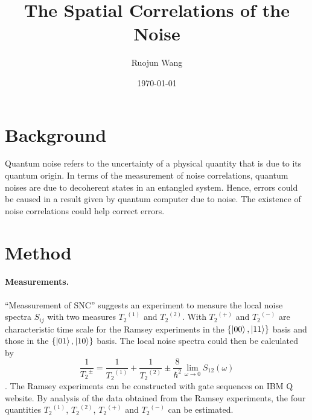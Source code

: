 \documentclass[letterpaper]{article}
\title{	
	\normalfont \normalsize 
	\huge The Spatial Correlations of the Noise
	\\ %
}
\author{Ruojun Wang} %
\date{\normalsize\today} %
\numberwithin{equation}{section} %
\numberwithin{figure}{section} %
\numberwithin{table}{section} %
\begin{document}
\maketitle %

\section{Background}
Quantum noise refers to the uncertainty of a physical quantity that is due to its quantum origin. In terms of the measurement of noise correlations, quantum noises are due to decoherent states in an entangled system. Hence, errors could be caused in a result given by quantum computer due to noise. The existence of noise correlations could help correct errors.  

\section{Method}

\paragraph{Measurements.}
\enquote{Meassurement of SNC} suggests an experiment to measure the local noise spectra $S_{ij}$ with two measures ${T_2}^{(1)}$ and ${T_2}^{(2)}$. With ${T_2}^{(+)}$ and ${T_2}^{(-)}$ are characteristic time scale for the Ramsey experiments in the $\left\{\ket{00}, \ket{11}\right\}$ basis and those in the $\left\{\ket{01}, \ket{10}\right\}$ basis. The local noise spectra could then be calculated by $$\frac{1}{{T_2}^{\pm}}=\frac{1}{{T_2}^{(1)}}+\frac{1}{{T_2}^{(2)}}\pm \frac{8}{\hbar^2} \lim_{\omega\to 0} S_{12}(\omega)$$. \cite{Premakumar} The Ramsey experiments can be constructed with gate sequences on IBM Q website. By analysis of the data obtained from the Ramsey experiments, the four quantities ${T_2}^{(1)}$, ${T_2}^{(2)}$, ${T_2}^{(+)}$ and ${T_2}^{(-)}$ can be estimated. 
\end{document}
